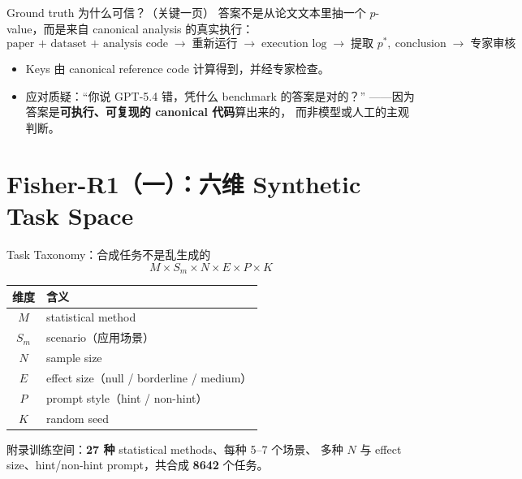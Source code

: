 \documentclass[aspectratio=169]{ctexbeamer}
\begin{document}
\begin{frame}{Ground truth 为什么可信？（关键一页）}
  答案不是从论文文本里抽一个 $p$-value，而是来自
  \alert{canonical analysis 的真实执行}：
  \[
    \text{paper + dataset + analysis code}
    \;\rightarrow\; \text{重新运行}
    \;\rightarrow\; \text{execution log}
    \;\rightarrow\; \text{提取 } p^{*},\ \text{conclusion}
    \;\rightarrow\; \text{专家审核}
  \]

  \medskip
  \begin{itemize}
    \item Keys 由 canonical reference code 计算得到，并经专家检查。
    \item 应对质疑：``你说 GPT-5.4 错，凭什么 benchmark 的答案是对的？''
          ——因为答案是\textbf{可执行、可复现的 canonical 代码}算出来的，
          而非模型或人工的主观判断。
  \end{itemize}
\end{frame}

\section{Fisher-R1（一）：六维 Synthetic Task Space}

\begin{frame}{Task Taxonomy：合成任务不是乱生成的}
  \[
    \boxed{\;M \times S_m \times N \times E \times P \times K\;}
  \]
  \begin{center}
  \begin{tabular}{c l}
    \toprule
    维度 & 含义 \\
    \midrule
    $M$   & statistical method \\
    $S_m$ & scenario（应用场景） \\
    $N$   & sample size \\
    $E$   & effect size（null / borderline / medium） \\
    $P$   & prompt style（hint / non-hint） \\
    $K$   & random seed \\
    \bottomrule
  \end{tabular}
  \end{center}

  \medskip
  附录训练空间：\textbf{27 种} statistical methods、每种 5--7 个场景、
  多种 $N$ 与 effect size、hint/non-hint prompt，共合成 \textbf{8642} 个任务。
\end{frame}
\end{document}
